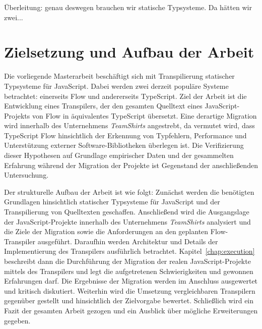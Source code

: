 Überleitung: genau deswegen brauchen wir statische Typsysteme. Da hätten wir zwei...

\section{Zielsetzung und Aufbau der Arbeit}


Die vorliegende Masterarbeit beschäftigt sich mit Transpilierung statischer Typsysteme für JavaScript. Dabei werden zwei derzeit populäre Systeme betrachtet: einerseits Flow und andererseits TypeScript. Ziel der Arbeit ist die Entwicklung eines Transpilers, der den gesamten Quelltext eines JavaScript-Projekts von Flow in äquivalentes TypeScript übersetzt. Eine derartige Migration wird innerhalb des Unternehmens \textit{TeamShirts} angestrebt, da vermutet wird, dass TypeScript Flow hinsichtlich der Erkennung von Typfehlern, Performance und Unterstützung externer Software-Bibliotheken überlegen ist. Die Verifizierung dieser Hypothesen auf Grundlage empirischer Daten und der gesammelten Erfahrung während der Migration der Projekte ist Gegenstand der anschließenden Untersuchung.

Der strukturelle Aufbau der Arbeit ist wie folgt: Zunächst werden die benötigten Grundlagen hinsichtlich statischer Typsysteme für JavaScript und der Transpilierung von Quelltexten geschaffen. Anschließend wird die Ausgangslage der JavaScript-Projekte innerhalb des Unternehmens \textit{TeamShirts} analysiert und die Ziele der Migration sowie die Anforderungen an den geplanten Flow-Transpiler ausgeführt. Daraufhin werden Architektur und Details der Implementierung des Transpilers ausführlich betrachtet. Kapitel~\ref{chap:execution} beschreibt dann die Durchführung der Migration der realen JavaScript-Projekte mittels des Transpilers und legt die aufgetretenen Schwierigkeiten und gewonnen Erfahrungen darf. Die Ergebnisse der Migration werden im Anschluss ausgewertet und kritisch diskutiert. Weiterhin wird die Umsetzung vergleichbaren Transpilern gegenüber gestellt und hinsichtlich der Zielvorgabe bewertet. Schließlich wird ein Fazit der gesamten Arbeit gezogen und ein Ausblick über mögliche Erweiterungen gegeben.
